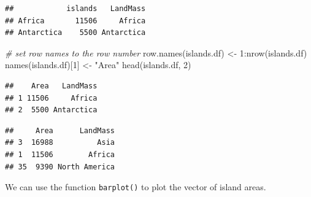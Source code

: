 \documentclass[
  11pt,
  a4paper,
]{book}
\newenvironment{Shaded}{\begin{snugshade}}{\end{snugshade}}
\newcommand{\AttributeTok}[1]{\textcolor[rgb]{0.77,0.63,0.00}{#1}}
\newcommand{\CommentTok}[1]{\textcolor[rgb]{0.56,0.35,0.01}{\textit{#1}}}
\newcommand{\ConstantTok}[1]{\textcolor[rgb]{0.00,0.00,0.00}{#1}}
\newcommand{\DecValTok}[1]{\textcolor[rgb]{0.00,0.00,0.81}{#1}}
\newcommand{\FunctionTok}[1]{\textcolor[rgb]{0.00,0.00,0.00}{#1}}
\newcommand{\NormalTok}[1]{#1}
\newcommand{\OtherTok}[1]{\textcolor[rgb]{0.56,0.35,0.01}{#1}}
\newcommand{\SpecialCharTok}[1]{\textcolor[rgb]{0.00,0.00,0.00}{#1}}
\newcommand{\StringTok}[1]{\textcolor[rgb]{0.31,0.60,0.02}{#1}}
\begin{document}
\begin{Shaded}
\end{Shaded}

\begin{verbatim}
##            islands   LandMass
## Africa       11506     Africa
## Antarctica    5500 Antarctica
\end{verbatim}

\begin{Shaded}
\begin{Highlighting}[]
\CommentTok{\# set row names to the row number}
\FunctionTok{row.names}\NormalTok{(islands.df) }\OtherTok{\textless{}{-}} \DecValTok{1}\SpecialCharTok{:}\FunctionTok{nrow}\NormalTok{(islands.df) }
\FunctionTok{names}\NormalTok{(islands.df)[}\DecValTok{1}\NormalTok{] }\OtherTok{\textless{}{-}} \StringTok{"Area"} 
\FunctionTok{head}\NormalTok{(islands.df, }\DecValTok{2}\NormalTok{) }
\end{Highlighting}
\end{Shaded}

\begin{verbatim}
##    Area   LandMass
## 1 11506     Africa
## 2  5500 Antarctica
\end{verbatim}

\begin{Shaded}
\end{Shaded}

\begin{verbatim}
##     Area      LandMass
## 3  16988          Asia
## 1  11506        Africa
## 35  9390 North America
\end{verbatim}

We can use the function \texttt{barplot()} to plot the vector of island areas.
\end{document}
